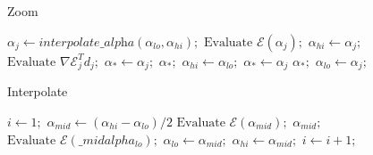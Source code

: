 \documentclass[12pt]{article}
\begin{document}
\begin{algorithm}
\caption{Zoom}\label{zoom}
\begin{algorithmic}[1]
\Repeat 
	\State  $ \alpha_j \gets \textit{interpolate\_alpha}(\alpha_{lo}, \alpha_{hi}); $
	\State $ \text{Evaluate }\mathcal{E}(\alpha_j);$
	\If {$[\mathcal{E}(\alpha_j) > \mathcal{E}(0) + \sigma_1\alpha_j\nabla\mathcal{E}_0^Td_0] \text{  or  } [\mathcal{E}(\alpha_j)\leq \mathcal{E}(\alpha_{lo}) $ }
		\State $\alpha_{hi} \gets \alpha_{j};$
	\Else 
		\State $\text{Evaluate } \nabla\mathcal{E}_j^Td_j; $
			\State $\alpha_* \gets \alpha_j; $
			\Return $\alpha_*; $
		\EndIf
			\State $\alpha_{hi} \gets \alpha_{lo}; $
		\EndIf
			\State $\alpha_* \gets\alpha_{j}$
			\Return $\alpha_*;$
		\EndIf
	\EndIf
	\State $\alpha_{lo} \gets \alpha_{j}; $
\EndRepeat 
\EndProcedure
\end{algorithmic}
\end{algorithm}


\begin{algorithm}
\caption{Interpolate}\label{bisection}
\begin{algorithmic}[1]
\State $i \gets \textit{1};$
	\State $\alpha_{mid} \gets (\alpha_{hi}-\alpha_{lo})/2$
	\State  $ \text{Evaluate }\mathcal{E}(\alpha_{mid});$
			\Return $\alpha_{mid}; $
		\EndIf	
	\State   $\text{Evaluate } \mathcal{E}(\_{mid}alpha_{lo}); $
		\State $\alpha_{lo} \gets \alpha_{mid}; $
	\Else
		\State $\alpha_{hi} \gets \alpha_{mid}; $
	\EndIf
	\State $i \gets i+1; $
\EndWhile
\EndProcedure
\end{algorithmic}
\end{algorithm}
\end{document}
